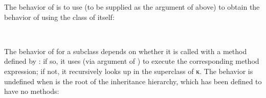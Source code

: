 \begin{AgdaAlign}
\begin{code}
\>[353I]\AgdaSymbol{(}\AgdaSpace{}%
\AgdaOperator{\AgdaInductiveConstructor{,}}\AgdaSpace{}%
\AgdaSpace{}%
\AgdaOperator{\AgdaInductiveConstructor{,}}\AgdaSpace{}%
\AgdaSymbol{)}\AgdaSpace{}%
\AgdaSymbol{=}\AgdaSpace{}%
\AgdaSymbol{(}\AgdaSpace{}%
\AgdaOperator{\AgdaInductiveConstructor{,}}\AgdaSpace{}%
\AgdaSpace{}%
\AgdaOperator{\AgdaInductiveConstructor{,}}\AgdaSpace{}%
\AgdaSymbol{)}\AgdaSpace{}%
\<%
\end{code}
%
The behavior of  is to use  
(to be supplied as the argument  of  above)
to obtain the behavior of  using the class of  itself:
%
\begin{code}%
\>[.][@{}l@{}]\<[353I]%
\>[6]\AgdaSpace{}%
\AgdaSymbol{:}\AgdaSpace{}%
\AgdaSpace{}%
\AgdaSpace{}%
\AgdaSpace{}%
\AgdaSpace{}%
\<%
\\
%
\>[6]\AgdaSpace{}%
\AgdaSpace{}%
\AgdaSymbol{=}\AgdaSpace{}%
\AgdaSpace{}%
\AgdaSymbol{(}\AgdaSpace{}%
\AgdaSymbol{)}\AgdaSpace{}%
\<%
\end{code}
%
The behavior of  for a subclass  
depends on whether it is called with a method  defined by :
if so, it uses  (via argument  of )
to execute the corresponding method expression;
if not, it recursively looks up  in the superclass of {κ}.
The behavior is undefined when  is the root of the inheritance hierarchy,
which has been defined to have no methods:
%
\begin{code}%
%
\>[6]\AgdaSpace{}%
\AgdaSymbol{:}\AgdaSpace{}%
\AgdaSpace{}%
\AgdaSpace{}%
\AgdaSpace{}%
\AgdaSpace{}%
\AgdaSpace{}%
\AgdaSpace{}%
\<%
\\
%
\>[6]\AgdaSpace{}%
\AgdaSymbol{(}\AgdaSpace{}%
\AgdaSpace{}%
\AgdaSymbol{)}\AgdaSpace{}%

\end{code}
\end{AgdaAlign}
